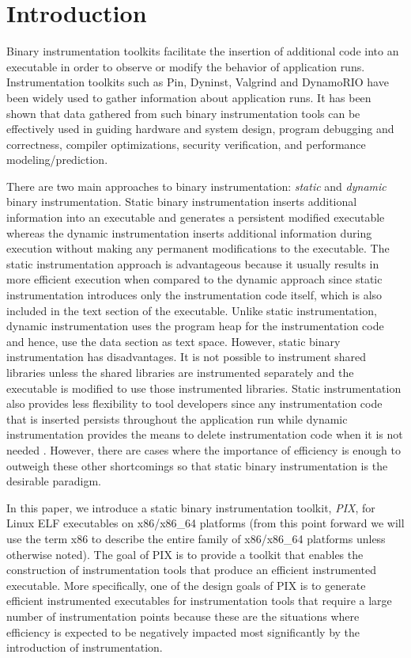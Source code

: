 \section{Introduction}

Binary instrumentation toolkits facilitate the insertion of additional code into an
executable in order to observe or modify the behavior of application runs. 
Instrumentation toolkits such as Pin\cite{luk2005pin}, Dyninst\cite{buck2000api}, 
Valgrind\cite{nethercote2007valgrind} and DynamoRIO\cite{bruening2004efficient} have been widely used to gather information about
application runs. It has been shown that data gathered 
from such binary instrumentation tools can be effectively used in guiding hardware and
system design, program debugging and correctness, compiler optimizations, security verification,
and performance modeling/prediction\cite{snavely2001modeling}.

There are two main approaches to binary instrumentation: \textit{static} 
and \textit{dynamic} binary instrumentation. Static binary
instrumentation inserts additional information into an executable and generates a persistent
modified executable whereas the dynamic instrumentation inserts additional information 
during execution without making any permanent modifications to the executable.
The static instrumentation approach is advantageous because it usually results in more
efficient execution when compared to the dynamic approach
since static instrumentation introduces only the instrumentation code itself, 
which is also included in the text section of the executable. 
Unlike static instrumentation, dynamic
instrumentation uses the program heap for the instrumentation code and hence, use the data section as text space.
However, static binary instrumentation has disadvantages. It is not possible to instrument shared libraries 
unless the shared libraries are instrumented separately and the executable is modified to use those instrumented libraries. 
Static instrumentation also provides less flexibility to tool developers since any instrumentation code that is
inserted persists throughout the application run while dynamic instrumentation 
provides the means to delete instrumentation code when it is not needed \cite{tikir2002efficient}.
However, there are cases where the importance of efficiency is enough to outweigh
these other shortcomings \cite{carrington2006performance} so that static binary instrumentation is the
desirable paradigm. 

In this paper, we introduce a static binary instrumentation toolkit, \textit{PIX}, for Linux ELF executables on
x86/x86\_64 platforms (from this point forward we will use the term x86 to describe the entire family
of x86/x86\_64 platforms unless otherwise noted). The goal of PIX is to provide a toolkit that enables the construction of
instrumentation tools that produce an efficient instrumented
executable. More specifically, one of the design goals of PIX is to generate efficient instrumented executables
for instrumentation tools that require a large number of instrumentation points because these are the situations 
where efficiency is expected to be negatively impacted most significantly by the introduction of instrumentation. 

